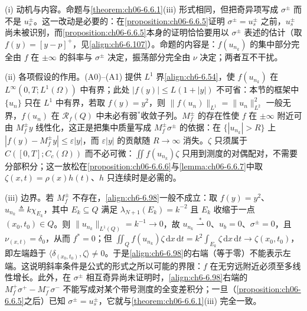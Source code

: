\documentclass[../../main.tex]{subfiles}%
\begin{document}
\begin{remark}\label{remark:ch06-6.6.4}
(i) 动机与内容。命题与\cref{theorem:ch06-6.6.1}(iii) 形式相同，但把奇异项写成 $\sigma^\pm$ 而不是 $u^\pm_s$。这一改动是必要的：在\cref{proposition:ch06-6.6.5}证明 $\sigma^\pm=u^\pm_s$ 之前，$u^\pm_s$ 尚未被识别，而\cref{proposition:ch06-6.6.5}本身的证明恰恰要用以 $\sigma^\pm$ 表述的估计（取 $f(y)=[y-p]^+$，见\eqref{align:ch6-6.107}）。命题的内容是：$f(u_{n_k})$ 的集中部分完全由 $f$ 在 $\pm\infty$ 的斜率与 $\sigma^\pm$ 决定，振荡部分完全由 $\nu$ 决定；两者互不干扰。

(ii) 各项假设的作用。(A0)--(A1) 提供 $L^1$ 界\eqref{align:ch6-6.54}，使 $f(u_{n_k})$ 在 $L^\infty(0,T;L^1(\Omega))$ 中有界；此处 $|f(y)|\leqslant L(1+|y|)$ 不可省：本节的框架中 $\{u_n\}$ 只在 $L^1$ 中有界，若取 $f(y)=y^2$，则 $\|f(u_n)\|_{L^1}=\|u_n\|^2_{L^2}$ 一般无界，$f(u_n)$ 在 $\mathscr{R}_f(Q)$ 中未必有弱$^*$收敛子列。$M^\pm_f$ 的存在性使 $f$ 在 $\pm\infty$ 附近可由 $M^\pm_f y$ 线性化，这正是把集中质量写成 $M^\pm_f\sigma^\pm$ 的依据：在 $\{|u_{n_k}|>R\}$ 上 $|f(y)-M^\pm_f y|\leqslant\varepsilon|y|$，而 $\varepsilon|y|$ 的贡献随 $R\to\infty$ 消失。$\zeta$ 只须属于 $C([0,T];C_c(\Omega))$ 而不必可微：$\iint f(u_{n_k})\zeta$ 只用到测度的对偶配对，不需要分部积分；这一放松在\cref{proposition:ch06-6.6.6}与\cref{lemma:ch06-6.6.7}中取 $\zeta(x,t)=\rho(x)h(t)$、$h$ 只连续时是必需的。

(iii) 边界。若 $M^\pm_f$ 不存在，\eqref{align:ch6-6.98}一般不成立：取 $f(y)=y^2$、$u_{n_k}\triangleq k\chi_{E_k}$，其中 $E_k\subseteq Q$ 满足 $\lambda_{N+1}(E_k)=k^{-2}$ 且 $E_k$ 收缩于一点 $(x_0,t_0)\in Q$。则 $\|u_{n_k}\|_{L^1(Q)}=k^{-1}\to0$，故 $u_{n_k}\stackrel{*}{\rightharpoonup}0$、$u_b=0$、$\sigma^\pm=0$，且 $\nu_{(x,t)}=\delta_0$，从而 $f^*=0$；但 $\iint_Qf(u_{n_k})\zeta\,\mathrm{d}x\,\mathrm{d}t=k^2\int_{E_k}\zeta\,\mathrm{d}x\,\mathrm{d}t\to\zeta(x_0,t_0)$，即左端趋于 $\langle\delta_{(x_0,t_0)},\zeta\rangle\neq0$。于是\eqref{align:ch6-6.98}的右端（等于零）不能表示左端。这说明斜率条件是公式的形式之所以可能的界限：$f$ 在无穷远附近必须至多线性增长。此外，在 $\sigma^\pm$ 相互奇异尚未证明时，\eqref{align:ch6-6.98}右端的 $M^+_f\sigma^+-M^-_f\sigma^-$ 不能写成对某个带号测度的全变差积分；一旦（\cref{proposition:ch06-6.6.5}之后）已知 $\sigma^\pm=u^\pm_s$，它就与\cref{theorem:ch06-6.6.1}(iii) 完全一致。
\end{remark}
\end{document}
